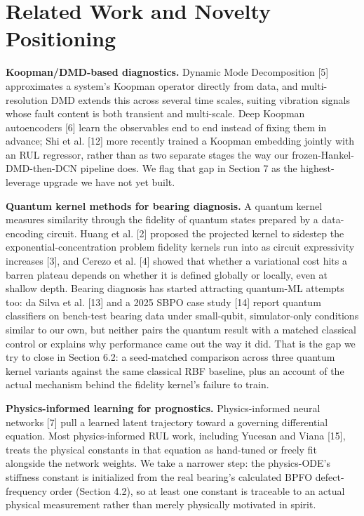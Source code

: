 \documentclass[3p,times,procedia]{elsarticle}
\begin{document}
\section{Related Work and Novelty Positioning}

\textbf{Koopman/DMD-based diagnostics.} Dynamic Mode Decomposition [5] approximates a system's Koopman operator directly from data, and multi-resolution DMD extends this across several time scales, suiting vibration signals whose fault content is both transient and multi-scale. Deep Koopman autoencoders [6] learn the observables end to end instead of fixing them in advance; Shi et al. [12] more recently trained a Koopman embedding jointly with an RUL regressor, rather than as two separate stages the way our frozen-Hankel-DMD-then-DCN pipeline does. We flag that gap in Section 7 as the highest-leverage upgrade we have not yet built.

\textbf{Quantum kernel methods for bearing diagnosis.} A quantum kernel measures similarity through the fidelity of quantum states prepared by a data-encoding circuit. Huang et al. [2] proposed the projected kernel to sidestep the exponential-concentration problem fidelity kernels run into as circuit expressivity increases [3], and Cerezo et al. [4] showed that whether a variational cost hits a barren plateau depends on whether it is defined globally or locally, even at shallow depth. Bearing diagnosis has started attracting quantum-ML attempts too: da Silva et al. [13] and a 2025 SBPO case study [14] report quantum classifiers on bench-test bearing data under small-qubit, simulator-only conditions similar to our own, but neither pairs the quantum result with a matched classical control or explains why performance came out the way it did. That is the gap we try to close in Section 6.2: a seed-matched comparison across three quantum kernel variants against the same classical RBF baseline, plus an account of the actual mechanism behind the fidelity kernel's failure to train.

\textbf{Physics-informed learning for prognostics.} Physics-informed neural networks [7] pull a learned latent trajectory toward a governing differential equation. Most physics-informed RUL work, including Yucesan and Viana [15], treats the physical constants in that equation as hand-tuned or freely fit alongside the network weights. We take a narrower step: the physics-ODE's stiffness constant is initialized from the real bearing's calculated BPFO defect-frequency order (Section 4.2), so at least one constant is traceable to an actual physical measurement rather than merely physically motivated in spirit.
\end{document}
